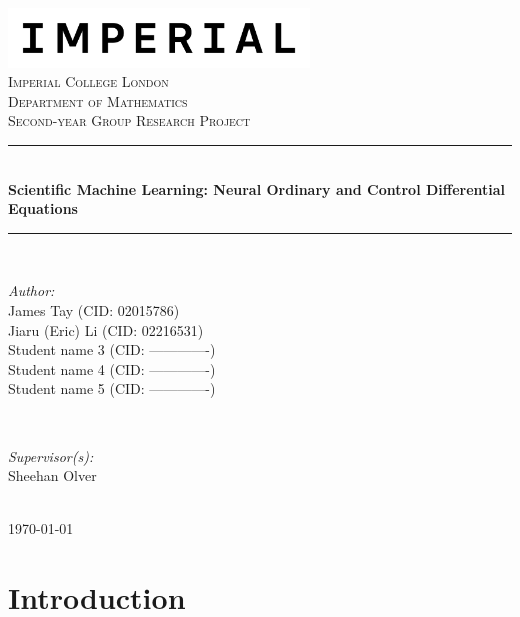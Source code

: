 \documentclass[a4paper,11pt, titlepage]{article}
\theoremstyle{definition}
\theoremstyle{plain}
\theoremstyle{remark}
\newcommand{\reporttitle}{Scientific Machine Learning: Neural Ordinary and Control Differential Equations}
\newcommand{\reportauthorA}{James Tay (CID: 02015786)}
\newcommand{\reportauthorB}{Jiaru (Eric) Li (CID: 02216531)}
\newcommand{\reportauthorC}{Student name 3 (CID: -------------)}
\newcommand{\reportauthorD}{Student name 4 (CID: -------------)}
\newcommand{\reportauthorE}{Student name 5 (CID: -------------)}
\newcommand{\supervisor}{Sheehan Olver}
\begin{document}
\begin{titlepage}
\newcommand{\HRule}{\rule{\linewidth}{0.5mm}}
\includegraphics[width=8cm]{figures/Imperial_logo.png}\\[1cm]
\center
\textsc{\LARGE Imperial College London}\\[0.5cm] 
\textsc{\Large Department of Mathematics}\\[1.5cm] 
\textsc{\Large Second-year Group Research Project}\\[0.5cm]
\makeatletter
\HRule \\[0.6cm]
{\huge \bfseries \reporttitle}\\[0.6cm]
\HRule \\[1.5cm]
\begin{minipage}{0.4\textwidth}
\begin{flushleft} \large
\emph{Author:}\\
\reportauthorA \\
\reportauthorB \\
\reportauthorC \\
\reportauthorD \\
\reportauthorE
\end{flushleft}
\end{minipage}
~
\begin{minipage}{0.4\textwidth}
\begin{flushright} \large
\emph{Supervisor(s):} \\
\supervisor
\end{flushright}
\end{minipage}\\[2cm]
\makeatother
\vfill
\makeatletter
{\large \today}\\[2cm]
\makeatother
\end{titlepage}
\begin{abstract}
\textcolor{red}{Type your abstract here. The abstract is a summary of the contents of the project. It should be brief but informative, and
should avoid technicalities as far as possible.}
\end{abstract}
\tableofcontents
\clearpage

\section{Introduction}
\label{sec:introduction}
\end{document}
